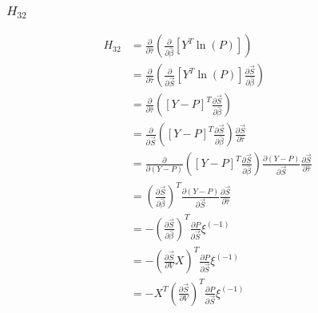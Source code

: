 \documentclass{article}
\begin{document}
\subsubsection{$H_{32}$}
\begin{equation}
\begin{aligned}
H_{32} &= \frac{\partial}{\partial \hat{\tau}}  \left( \frac{\partial}{\partial \hat{\beta}}  \left[ Y^T \ln \left( P \right) \right] \right) 
\\
&= \frac{\partial}{\partial \hat{\tau}}  \left( \frac{\partial}{\partial \vec{S}}  \left[ Y^T \ln \left( P \right) \right] \frac{\partial \vec{S}}{\partial \hat{\beta}} \right) 
\\
&= \frac{\partial}{\partial \hat{\tau}}  \left( \left[ Y - P \right]^T \frac{\partial \vec{S}}{\partial \hat{\beta}} \right) 
\\
&= \frac{\partial}{\partial \vec{S}}  \left( \left[ Y - P \right]^T \frac{\partial \vec{S}}{\partial \hat{\beta}} \right) \frac{\partial \vec{S}}{\partial \hat{\tau}} 
\\
&= \frac{\partial}{\partial \left( Y - P \right)}  \left( \left[ Y - P \right]^T \frac{\partial \vec{S}}{\partial \hat{\beta}} \right) \frac{\partial \left( Y - P \right)}{\partial \vec{S}} \frac{\partial \vec{S}}{\partial \hat{\tau}} 
\\
&= \left( \frac{\partial \vec{S}}{\partial \hat{\beta}} \right)^T \frac{\partial \left( Y - P \right)}{\partial \vec{S}} \frac{\partial \vec{S}}{\partial \hat{\tau}} 
\\
&= - \left( \frac{\partial \vec{S}}{\partial \hat{\beta}} \right)^T \frac{\partial P}{\partial \vec{S}} \xi^{(-1)}  \\
&= - \left( \frac{\partial \vec{S}}{\partial V} X  \right)^T \frac{\partial P}{\partial \vec{S}} \xi^{(-1)} \\
&= - X^T \left( \frac{\partial \vec{S}}{\partial V} \right)^T \frac{\partial P}{\partial \vec{S}} \xi^{(-1)}
\end{aligned}
\end{equation}
\end{document}
